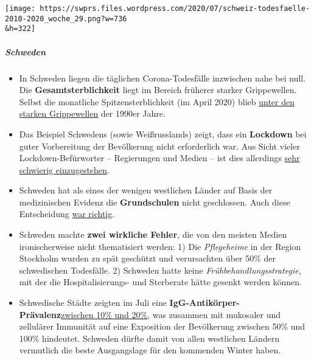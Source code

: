 \texttt{[image: https://swprs.files.wordpress.com/2020/07/schweiz-todesfaelle-2010-2020\_woche\_29.png?w=736\\\&h=322]}

\hypertarget{schweden}{%
\subparagraph{\texorpdfstring{\textbf{Schweden}}{Schweden}}\label{schweden}}

\begin{itemize}
\tightlist
\item
  In Schweden liegen die täglichen Corona-Todesfälle inzwischen nahe bei
  null. Die \textbf{Gesamtsterblichkeit} liegt im Bereich früherer
  starker Grippewellen. Selbst die monatliche Spitzensterblichkeit (im
  April 2020) blieb
  \href{https://emanuelkarlsten.se/more-swedes-died-in-one-month-1993-and-2000-compared-to-april-2020-why/}{unter
  den starken Grippewellen} der 1990er Jahre.
\item
  Das Beispiel Schwedens (sowie Weißrusslands) zeigt, dass ein
  \textbf{Lockdown} bei guter Vorbereitung der Bevölkerung nicht
  erforderlich war. Aus Sicht vieler Lockdown-Befürworter -- Regierungen
  und Medien -- ist dies allerdings
  \href{https://emanuelkarlsten.se/multiple-errors-in-the-new-york-times-article-about-swedens-corona-strategy/}{sehr
  schwierig einzugestehen}.
\item
  Schweden hat als eines der wenigen westlichen Länder auf Basis der
  medizinischen Evidenz die \textbf{Grundschulen} nicht geschlossen.
  Auch diese Entscheidung
  \href{https://www.reuters.com/article/us-health-coronavirus-sweden-schools-idUSKCN24G2IS}{war
  richtig}.
\item
  Schweden machte \textbf{zwei wirkliche Fehler}, die von den meisten
  Medien ironischerweise nicht thematisiert werden: 1) Die
  \emph{Pflegeheime} in der Region Stockholm wurden zu spät geschützt
  und verursachten über 50\% der schwedischen Todesfälle. 2) Schweden
  hatte keine \emph{Früh­behand­lungs­strategie}, mit der die
  Hospitalisierungs- und Sterberate hätte gesenkt werden können.
\item
  Schwedische Städte zeigten im Juli eine
  \textbf{IgG-Antikörper-Prävalenz}\href{https://www.sll.se/verksamhet/halsa-och-vard/nyheter-halsa-och-vard/2020/07/20-juli-lagesrapport-om-arbetet-med-det-nya-coronaviruset/}{zwischen
  10\% und 20\%}, was zusammen mit mukosaler und zellulärer Immunität
  auf eine Exposition der Bevölkerung zwischen 50\% und 100\% hindeutet.
  Schweden dürfte damit von allen westlichen Ländern vermutlich die
  beste Ausgangslage für den kommenden Winter haben.
\end{itemize}

